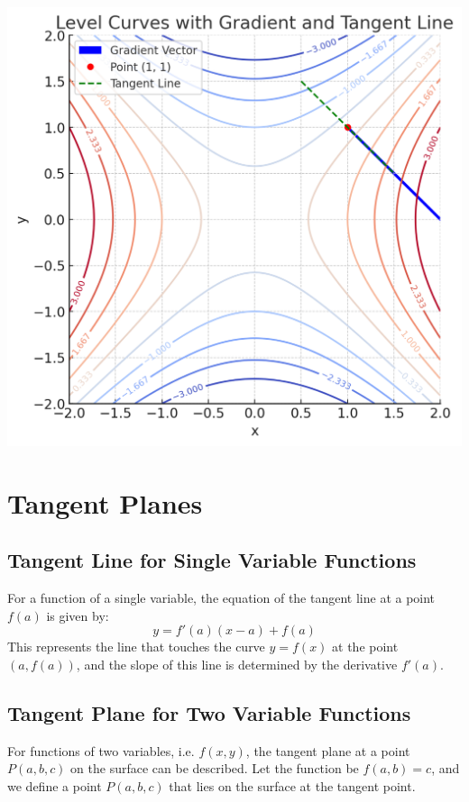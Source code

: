\documentclass{report}
\begin{document}
\begin{center}
	\includegraphics[scale=0.5]{levelcurves.png}
\end{center}

\section{Tangent Planes}

\subsection{Tangent Line for Single Variable Functions}

For a function of a single variable, the equation of the tangent line at a point \(f(a)\) is given by:
\[
	y = f'(a)(x - a) + f(a)
\]
This represents the line that touches the curve \(y = f(x)\) at the point \((a, f(a))\), and the slope of this line is determined by the derivative \(f'(a)\).

\subsection{Tangent Plane for Two Variable Functions}

For functions of two variables, i.e. \(f(x, y)\), the tangent plane at a point \(P(a, b, c)\) on the surface can be described. Let the function be \(f(a, b) = c\), and we define a point \(P(a, b, c)\) that lies on the surface at the tangent point.
\end{document}
